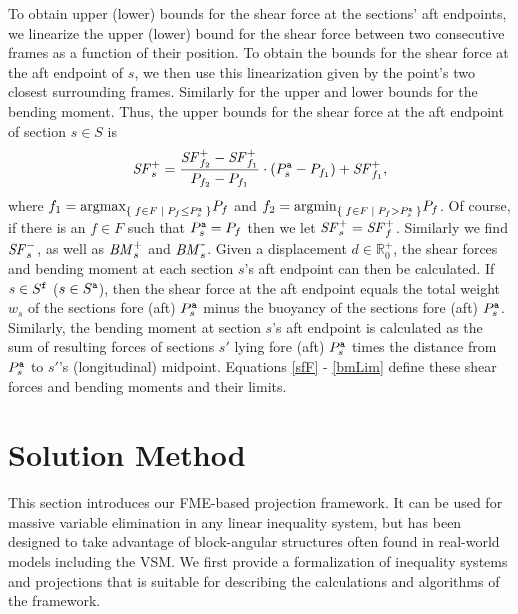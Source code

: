 To obtain upper (lower) bounds for the shear force at the sections' aft endpoints,  we linearize the upper (lower) bound for the shear force between two consecutive frames as a function of their position. To obtain the bounds for the shear force at the aft endpoint of $s$, we then use this linearization given by the point's two closest surrounding frames. Similarly for the upper and lower bounds for the bending moment. Thus, the upper bounds for the shear force at the aft endpoint of section $s\in S$ is
\[
\mathit{SF}^+_s = \frac{\mathit{SF}^+_{f_2}-\mathit{SF}^+_{f_1}}{P_{f_2}-P_{f_1}}\cdot(P^{\texttt{a}}_s - P_{f_1}) + \mathit{SF}^+_{f_1}, 
\]
where $f_1 = \text{argmax}_{\{\;{f\in F}\;|\;{P_f\leq P^{\texttt{a}}_s}\;\}}P_f$ and $f_2 = \text{argmin}_{\{\;{f\in F}\;|\;{P_f>P^{\texttt{a}}_s}\;\}}P_f$. Of course, if there is an $f\in F$ such that $P^{\texttt{a}}_s = P_f$ then we let $\mathit{SF}^+_s = \mathit{SF}^+_f$. Similarly we find $\mathit{SF}^-_s$, as well as $\mathit{BM}^+_s$ and $\mathit{BM}^{\texttt{-}}_s$. Given a displacement $d\in\mathbb{R}^+_0$, the shear forces and bending moment at each section $s$'s aft endpoint can then be calculated. If $s\in S^{\texttt{f}}$ ($s\in S^{\texttt{a}}$), then the shear force at the aft endpoint equals the total weight $w_s$ of the sections fore (aft) $P^{\texttt{a}}_s$ minus the buoyancy of the sections fore (aft) $P^{\texttt{a}}_s$. Similarly, the bending moment at section $s$'s aft endpoint is calculated as the sum of resulting forces of sections $s'$ lying fore (aft) $P^{\texttt{a}}_s$ times the distance from $P^{\texttt{a}}_s$ to $s'$'s (longitudinal) midpoint. Equations \eqref{sfF} - \eqref{bmLim} define these shear forces and bending moments and their limits.

\section{Solution Method} \label{sec:solutionMethod}

This section introduces our FME-based projection framework. It can be used for massive variable elimination in any linear inequality system, but has been designed to take advantage of block-angular structures often found in real-world models including the VSM. We first provide a formalization of inequality systems and projections that is suitable for describing the calculations and algorithms of the framework. 

